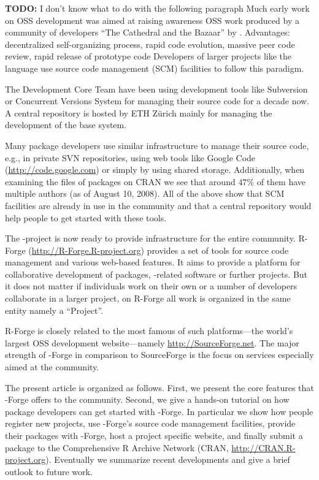 \textbf{TODO: } I don't know what to do with the following paragraph
Much early work on OSS development was aimed at raising awareness  OSS
work produced by a community of developers ``The Cathedral and the
Bazaar'' by \cite{forge:Raymond:1999}.
Advantages:
decentralized self-organizing process, rapid code evolution, massive
peer code review, rapid release of prototype code
Developers of larger projects like the language \R{} use source code
management (SCM) facilities to follow this paradigm.

The \R{} Development Core Team have been using
development tools like Subversion \citep[SVN,
see][]{forge:Pilato+Collins-Sussman+Fitzpatrick:2004} or  
Concurrent Versions System \citep[CVS, see][]{forge:Cederqvist:2006}
for managing their source code for a decade now.  
A central repository is hosted by ETH Z\"urich mainly for
managing the development of the base \R{} system. 

Many package developers use similar infrastructure to manage their
source code, e.g., in private SVN repositories, using web tools like
Google Code (\url{http://code.google.com}) or simply by using shared
storage. Additionally, when examining the  files of
packages on CRAN we see that around $47\%$ of them have multiple
authors (as of August 10, 2008). All of the above show that SCM
facilities are already in use in the \R{} community and that a central
repository would help people to get started with these tools.

The \R{}-project is now ready to provide infrastructure
for the entire \R{} community. 
R-Forge (\url{http://R-Forge.R-project.org}) provides a set of tools
for source code management and various web-based
features. It aims to provide a platform for collaborative development of
\R{} packages, \R{}-related software or further projects. But it does not
matter if individuals work on their own or a number of developers
collaborate in a larger project, on R-Forge all work is organized in
the same entity namely a ``Project''.

R-Forge is closely related to the most famous of such platforms---the
world's largest OSS development website---namely
\url{http://SourceForge.net}. The major strength of \R{}-Forge in
comparison to SourceForge is the focus on services especially aimed at
the \R{} community.

The present article is organized as follows. First, we present the core
features that \R{}-Forge offers to the \R{} community. Second, we
give a hands-on tutorial on how package developers can get started with 
\R{}-Forge. In particular we show how people register new projects,
use \R{}-Forge's source code management facilities, provide their 
packages with \R{}-Forge, host a project specific website, and
finally submit a package to the Comprehensive R Archive Network (CRAN,
\url{http://CRAN.R-project.org}).
Eventually we summarize recent developments and give a brief outlook
to future work.

